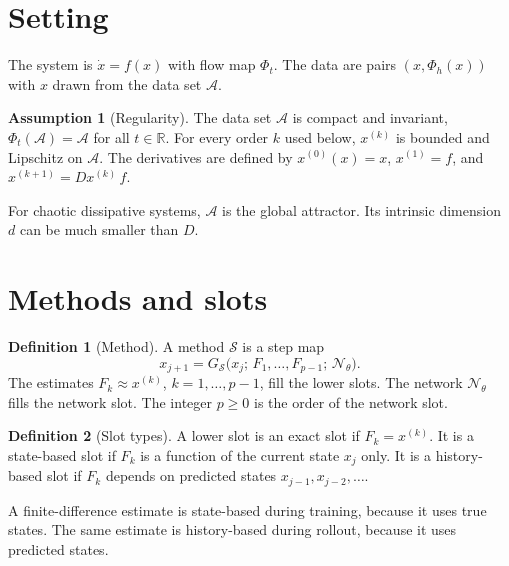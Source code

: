 \documentclass[11pt]{article}
\theoremstyle{definition}
\newtheorem{definition}{Definition}
\newtheorem{assumption}{Assumption}
\theoremstyle{remark}
\newcommand{\R}{\mathbb{R}}
\newcommand{\Aset}{\mathcal{A}}          %
\newcommand{\Net}{\mathcal{N}_\theta}    %
\newcommand{\Meth}{\mathcal{S}}          %
\begin{document}
\section{Setting}\label{sec:setting}

The system is $\dot x = f(x)$ with flow map $\Phi_t$.
The data are pairs $(x, \Phi_h(x))$ with $x$ drawn from the data set $\Aset$.

\begin{assumption}[Regularity]\label{ass:regular}
The data set $\Aset$ is compact and invariant, $\Phi_t(\Aset) = \Aset$ for all $t \in \R$.
For every order $k$ used below, $x^{(k)}$ is bounded and Lipschitz on $\Aset$.
The derivatives are defined by $x^{(0)}(x) = x$, $x^{(1)} = f$, and $x^{(k+1)} = D x^{(k)}\, f$.
\end{assumption}

For chaotic dissipative systems, $\Aset$ is the global attractor.
Its intrinsic dimension $d$ can be much smaller than $D$.

\section{Methods and slots}\label{sec:methods}

\begin{definition}[Method]\label{def:method}
A method $\Meth$ is a step map
\begin{equation}\label{eq:method}
x_{j+1} = G_\Meth\big(x_j;\, F_1,\dots,F_{p-1};\, \Net\big).
\end{equation}
The estimates $F_k \approx x^{(k)}$, $k = 1,\dots,p-1$, fill the lower slots.
The network $\Net$ fills the network slot.
The integer $p \ge 0$ is the order of the network slot.
\end{definition}

\begin{definition}[Slot types]\label{def:slottype}
A lower slot is an exact slot if $F_k = x^{(k)}$.
It is a state-based slot if $F_k$ is a function of the current state $x_j$ only.
It is a history-based slot if $F_k$ depends on predicted states $x_{j-1}, x_{j-2},\dots$.
\end{definition}

A finite-difference estimate is state-based during training, because it uses true states.
The same estimate is history-based during rollout, because it uses predicted states.
\end{document}
